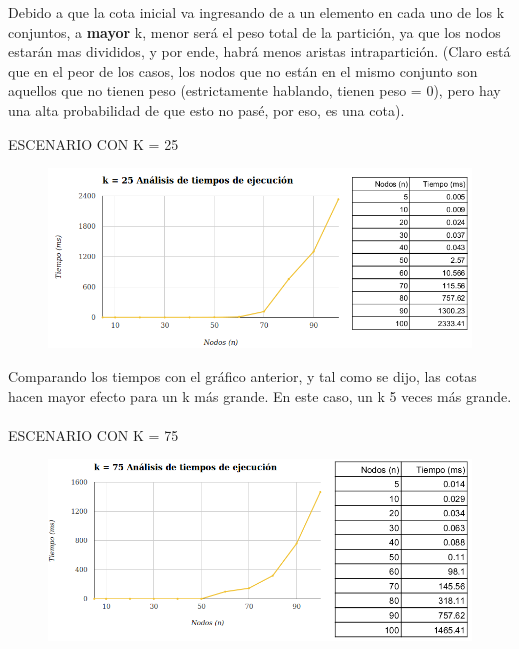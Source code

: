 \documentclass[10pt,a4paper]{article}
\begin{document}
Debido a que la cota inicial va ingresando de a un elemento en cada uno de los k conjuntos, a \textbf{mayor} k, menor será el peso total de la partición, ya que los nodos estarán mas divididos, y por ende, habrá menos aristas intrapartición. (Claro está que en el peor de los casos, los nodos que no están en el mismo conjunto son aquellos que no tienen peso (estrictamente hablando, tienen peso = 0), pero hay una alta probabilidad de que esto no pasé, por eso, es una cota).

\newpage ESCENARIO CON K = 25
	\begin{figure}[h]
		\begin{center}
		   \includegraphics[scale=0.80]{paraGraficar/k25.png}
		\end{center}
	\end{figure}

Comparando los tiempos con el gráfico anterior, y tal como se dijo, las cotas hacen mayor efecto para un k más grande. En este caso, un k 5 veces más grande.\\
\\

\indent ESCENARIO CON K = 75
	\begin{figure}[h]
		\begin{center}
		   \includegraphics[scale=0.80]{paraGraficar/k75.png}
		\end{center}
	\end{figure}
\end{document}
